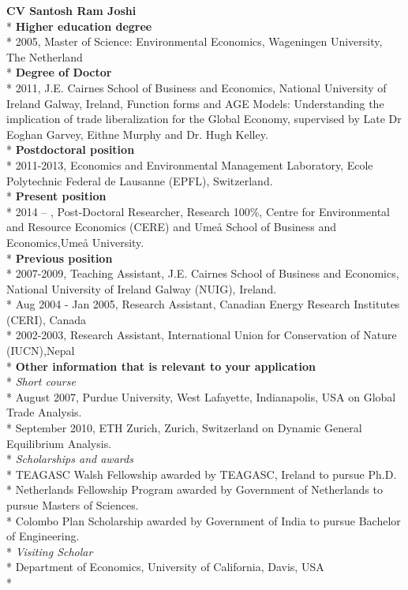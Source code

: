 \documentclass[11pt,a4paper]{extarticle}
\begin{document}
\pagebreak
\textbf{CV Santosh Ram Joshi}\\*
\textbf{Higher education degree}\\*
2005, Master of Science: Environmental Economics, Wageningen University, The Netherland\\*
\textbf{Degree of Doctor}\\*
2011, J.E. Cairnes School of Business and Economics, National University of Ireland Galway, Ireland, Function forms and AGE Models: Understanding the implication of trade liberalization for the Global Economy, supervised by Late Dr Eoghan Garvey, Eithne Murphy and Dr. Hugh Kelley.\\*
\textbf{Postdoctoral position}\\*
2011-2013, Economics and Environmental Management Laboratory, Ecole Polytechnic Federal de Lausanne (EPFL), Switzerland.\\*
\textbf{Present position}\\*
2014 – , Post-Doctoral Researcher, Research 100\%, Centre for Environmental and Resource Economics (CERE) and Umeå School of Business and Economics,Umeå University.\\*
\textbf{Previous position}\\*
2007-2009, Teaching Assistant, J.E. Cairnes School of Business and Economics, National University of Ireland Galway (NUIG), Ireland.\\*
Aug 2004 - Jan 2005, Research Assistant, Canadian Energy Research Institutes (CERI), Canada\\*
2002-2003, Research Assistant, International Union for Conservation of Nature (IUCN),Nepal\\*
\textbf{Other information that is relevant to your application}\\*
\textit{Short course}\\*
August 2007, Purdue University, West Lafayette, Indianapolis, USA on Global Trade Analysis.\\*
September 2010, ETH Zurich, Zurich,  Switzerland on Dynamic General Equilibrium Analysis.\\*
\textit{Scholarships and awards}\\*
TEAGASC Walsh Fellowship awarded by TEAGASC, Ireland to pursue Ph.D.\\*
Netherlands Fellowship Program awarded by Government of Netherlands to pursue Masters of Sciences.\\*
Colombo Plan Scholarship awarded by Government of India to pursue Bachelor of Engineering.\\*
\textit{Visiting Scholar}\\*
Department of Economics, University of California, Davis, USA\\*
\end{document}
